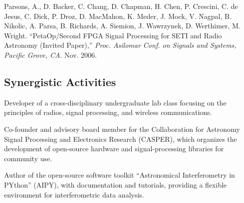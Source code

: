 \documentclass[apjpt4]{aastex}
\begin{document}
Parsons, A., D. Backer, C. Chang, D. Chapman, H. Chen, P. Crescini, C. de Jesus,
C. Dick, P. Droz, D. MacMahon, K. Meder, J. Mock, V. Nagpal, B. Nikolic, 
A. Parsa, B. Richards, A. Siemion, J. Wawrzynek, D. Werthimer, M. Wright.
``PetaOp/Second FPGA Signal Processing for SETI and Radio Astronomy (Invited 
Paper),'' 
{\it Proc. Asilomar Conf. on Signals and Systems, Pacific Grove, CA}. 
Nov. 2006.



\subsection*{Synergistic Activities}
\vspace{-8pt}


Developer of a cross-disciplinary undergraduate lab class focusing on the principles of radios, 
signal processing, and wireless communications.

Co-founder and advisory board member for the Collaboration for Astronomy
Signal Processing and Electronics Research (CASPER), which organizes the
development of open-source hardware and signal-processing libraries for community use.

Author of the open-source software toolkit ``Astronomical Interferometry in
PYthon'' (AIPY), with documentation and tutorials, 
providing a flexible environment for interferometric data analysis.
\end{document}
